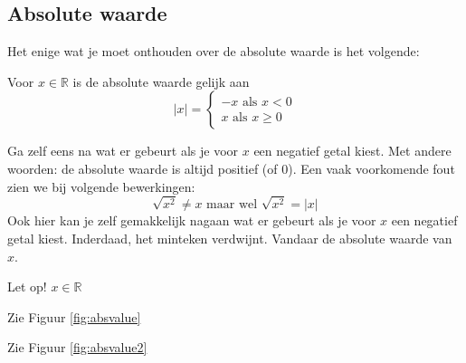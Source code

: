 \subsection{Absolute waarde}
Het enige wat je moet onthouden over de absolute waarde is het volgende:

\begin{definitie}
	Voor $x \in \mathbb{R}$ is de absolute waarde gelijk aan 
	\begin{equation*}
	|x| = \begin{cases}
	-x \text{ als } x<0 \\
	x \text{ als } x\ge 0 
	\end{cases}
	\end{equation*}
\end{definitie}

Ga zelf eens na wat er gebeurt als je voor $x$ een negatief getal kiest.
Met andere woorden: de absolute waarde is altijd positief (of 0).
Een vaak voorkomende fout zien we bij volgende bewerkingen:
\begin{equation*}
\sqrt{x^2}\ne x \text{ maar wel } \sqrt{x^2}=|x|
\end{equation*}
Ook hier kan je zelf gemakkelijk nagaan wat er gebeurt als je voor $x$ een negatief getal kiest. Inderdaad, het minteken verdwijnt. Vandaar de absolute waarde van $x$.

\begin{opmerking}
Let op! $x \in \mathbb{R}$	
\end{opmerking}

\begin{voorbeeld}
Zie Figuur \ref{fig:absvalue}

%
\end{voorbeeld}

\begin{voorbeeld}
	Zie Figuur \ref{fig:absvalue2}
\end{voorbeeld}

